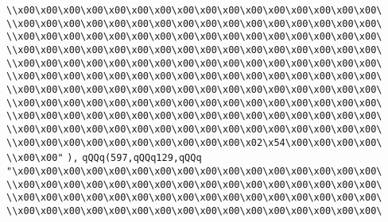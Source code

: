 \verb|\\x00\x00\x00\x00\x00\x00\x00\x00\x00\x00\x00\x00\x00\x00\x00\x00\|\newline
\verb|\\x00\x00\x00\x00\x00\x00\x00\x00\x00\x00\x00\x00\x00\x00\x00\x00\|\newline
\verb|\\x00\x00\x00\x00\x00\x00\x00\x00\x00\x00\x00\x00\x00\x00\x00\x00\|\newline
\verb|\\x00\x00\x00\x00\x00\x00\x00\x00\x00\x00\x00\x00\x00\x00\x00\x00\|\newline
\verb|\\x00\x00\x00\x00\x00\x00\x00\x00\x00\x00\x00\x00\x00\x00\x00\x00\|\newline
\verb|\\x00\x00\x00\x00\x00\x00\x00\x00\x00\x00\x00\x00\x00\x00\x00\x00\|\newline
\verb|\\x00\x00\x00\x00\x00\x00\x00\x00\x00\x00\x00\x00\x00\x00\x00\x00\|\newline
\verb|\\x00\x00\x00\x00\x00\x00\x00\x00\x00\x00\x00\x00\x00\x00\x00\x00\|\newline
\verb|\\x00\x00\x00\x00\x00\x00\x00\x00\x00\x00\x00\x00\x00\x00\x00\x00\|\newline
\verb|\\x00\x00\x00\x00\x00\x00\x00\x00\x00\x00\x00\x00\x00\x00\x00\x00\|\newline
\verb|\\x00\x00\x00\x00\x00\x00\x00\x00\x00\x00\x02\x54\x00\x00\x00\x00\|\newline
\verb|\\x00\x00"|\newline
\verb|),|\newline
\verb|qQQq(597,qQQq129,qQQq|\newline
\verb|"\x00\x00\x00\x00\x00\x00\x00\x00\x00\x00\x00\x00\x00\x00\x00\x00\|\newline
\verb|\\x00\x00\x00\x00\x00\x00\x00\x00\x00\x00\x00\x00\x00\x00\x00\x00\|\newline
\verb|\\x00\x00\x00\x00\x00\x00\x00\x00\x00\x00\x00\x00\x00\x00\x00\x00\|\newline
\verb|\\x00\x00\x00\x00\x00\x00\x00\x00\x00\x00\x00\x00\x00\x00\x00\x00\|\newline
